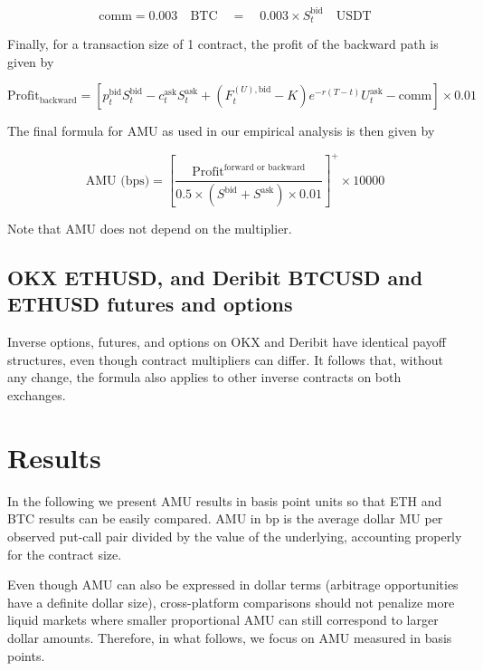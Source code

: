 \documentclass[12pt]{article}
\begin{document}
    \begin{equation}
    \text{comm} = 0.003 \quad \text{BTC} \quad = \quad 0.003 \times S_t^\text{bid} \quad \text{USDT}
    \end{equation}

Finally, for a transaction size of 1 contract, the profit of the backward path is given by

\begin{equation}
\text{Profit}_\text{backward}
=
\left[
p_t^{\text{bid}} S_t^{\text{bid}}
-
c_t^{\text{ask}} S_t^{\text{ask}}
+
(F^{(U),\text{bid}}_t - K)e^{-r(T-t)} U_t^{\text{ask}}
-
\text{comm}
\right]\times 0.01
\end{equation}

The final formula for AMU as used in our empirical analysis is then given by

\begin{equation}
    \text{AMU (bps)} = \left[
        \frac{\text{Profit}^\text{forward or backward}}{0.5\times(S^\text{bid} + S^\text{ask})\times 0.01}
    \right]^+\times 10000
\end{equation}

Note that AMU does not depend on the multiplier.

\subsection{OKX ETHUSD, and Deribit BTCUSD and ETHUSD futures and options}

Inverse options, futures, and options on OKX and Deribit have identical payoff structures, even though contract multipliers can differ. It follows that, without any change, the formula also applies to other inverse contracts on both exchanges.



\section{Results}

In the following we present AMU results in basis point units so that ETH and BTC results can be easily compared. AMU in bp is the average dollar MU per observed put-call pair divided by the value of the underlying, accounting properly for the contract size.

Even though AMU can also be expressed in dollar terms (arbitrage opportunities have a definite dollar size), cross-platform comparisons should not penalize more liquid markets where smaller proportional AMU can still correspond to larger dollar amounts. Therefore, in what follows, we focus on AMU measured in basis points.
\end{document}
